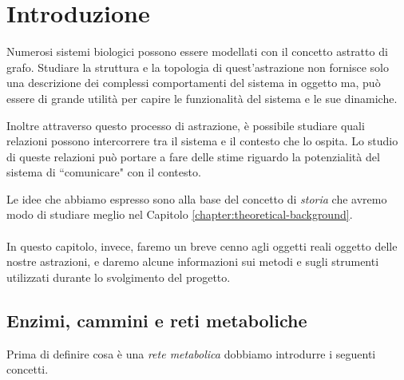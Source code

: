 \chapter{Introduzione}
\label{chapter:introduction}

Numerosi sistemi biologici possono essere modellati con il concetto
astratto di grafo. Studiare la struttura e la topologia di
quest'astrazione non fornisce solo una descrizione dei complessi
comportamenti del sistema in oggetto ma, pu\`o essere di grande
utilit\`a per capire le funzionalit\`a del sistema e le sue dinamiche.

Inoltre attraverso questo processo di astrazione, \`e possibile
studiare quali relazioni possono intercorrere tra il sistema e il
contesto che lo ospita. Lo studio di queste relazioni pu\`o portare a
fare delle stime riguardo la potenzialit\`a del sistema di
``comunicare" con il contesto.

Le idee che abbiamo espresso sono alla base del concetto di
\emph{storia} che avremo modo di studiare meglio nel Capitolo
\ref{chapter:theoretical-background}.  
\\\\
In questo capitolo, invece, faremo un breve cenno agli oggetti reali
oggetto delle nostre astrazioni, e daremo alcune informazioni sui
metodi e sugli strumenti utilizzati durante lo svolgimento del
progetto.

\section{Enzimi, cammini e reti metaboliche}

Prima di definire cosa \`e una \emph{rete metabolica} dobbiamo
introdurre i seguenti concetti.

